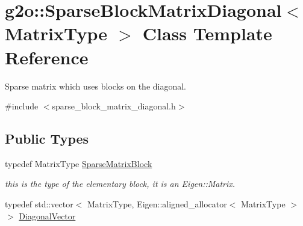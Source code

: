 \hypertarget{classg2o_1_1SparseBlockMatrixDiagonal}{}\section{g2o\+:\+:Sparse\+Block\+Matrix\+Diagonal$<$ Matrix\+Type $>$ Class Template Reference}
\label{classg2o_1_1SparseBlockMatrixDiagonal}


Sparse matrix which uses blocks on the diagonal.  




{\ttfamily \#include $<$sparse\+\_\+block\+\_\+matrix\+\_\+diagonal.\+h$>$}

\subsection*{Public Types}
\begin{DoxyCompactItemize}
\item 
typedef Matrix\+Type \hyperlink{classg2o_1_1SparseBlockMatrixDiagonal_a93a57bc93d5b099fcd424ba1fc1a0585}{Sparse\+Matrix\+Block}
\begin{DoxyCompactList}\small\item\em this is the type of the elementary block, it is an Eigen\+::\+Matrix. \end{DoxyCompactList}\item 
typedef std\+::vector$<$ Matrix\+Type, Eigen\+::aligned\+\_\+allocator$<$ Matrix\+Type $>$ $>$ \hyperlink{classg2o_1_1SparseBlockMatrixDiagonal_a2eb7fc4130fac5c499b57f3bec855812}{Diagonal\+Vector}
\end{DoxyCompactItemize}
